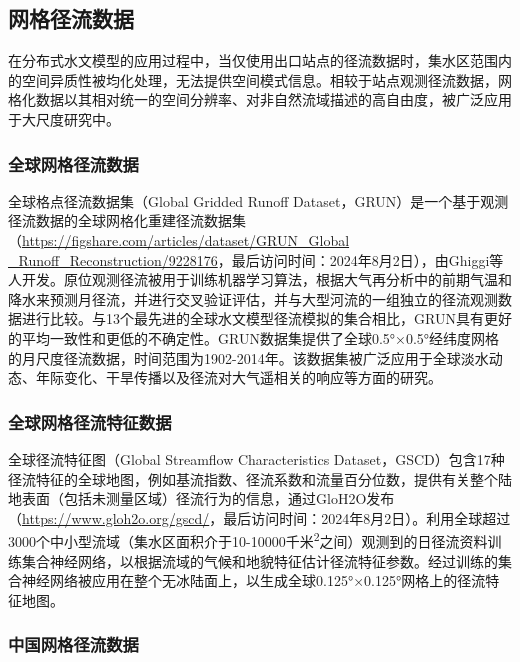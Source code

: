\subsection{网格径流数据}

在分布式水文模型的应用过程中，当仅使用出口站点的径流数据时，集水区范围内的空间异质性被均化处理，无法提供空间模式信息。相较于站点观测径流数据，网格化数据以其相对统一的空间分辨率、对非自然流域描述的高自由度，被广泛应用于大尺度研究中。\par

\subsubsection{全球网格径流数据}

全球格点径流数据集（Global Gridded Runoff Dataset，GRUN）是一个基于观测径流数据的全球网格化重建径流数据集（\href{https://figshare.com/articles/dataset/GRUN_Global_Runoff_Reconstruction/9228176}{https://figshare.com/articles/dataset/GRUN\_Global \_Runoff\_Reconstruction/9228176}，最后访问时间：2024年8月2日），由Ghiggi等人开发\cite{ghiggiGRUNObservationbasedGlobal2019, ghiggiGRUNENSEMBLEMultiForcing2021}。原位观测径流被用于训练机器学习算法，根据大气再分析中的前期气温和降水来预测月径流，并进行交叉验证评估，并与大型河流的一组独立的径流观测数据进行比较。与13个最先进的全球水文模型径流模拟的集合相比，GRUN具有更好的平均一致性和更低的不确定性。GRUN数据集提供了全球0.5°×0.5°经纬度网格的月尺度径流数据，时间范围为1902-2014年。该数据集被广泛应用于全球淡水动态、年际变化、干旱传播以及径流对大气遥相关的响应等方面的研究。\par

\subsubsection{全球网格径流特征数据}

全球径流特征图（Global Streamflow Characteristics Dataset，GSCD）包含17种径流特征的全球地图，例如基流指数、径流系数和流量百分位数，提供有关整个陆地表面（包括未测量区域）径流行为的信息\cite{beckGlobalPatternsBase2013, beckGlobalMapsStreamflow2015}，通过GloH2O发布（\href{https://www.gloh2o.org/gscd/}{https://www.gloh2o.org/gscd/}，最后访问时间：2024年8月2日）。利用全球超过3000个中小型流域（集水区面积介于10-10000千米\textsuperscript2之间）观测到的日径流资料训练集合神经网络，以根据流域的气候和地貌特征估计径流特征参数。经过训练的集合神经网络被应用在整个无冰陆面上，以生成全球0.125°×0.125°网格上的径流特征地图。

\subsubsection{中国网格径流数据}


